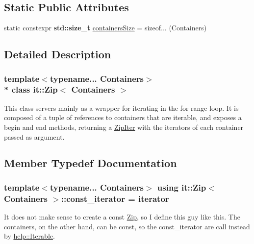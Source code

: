 \subsection*{Static Public Attributes}
\begin{DoxyCompactItemize}
\item 
static constexpr {\bf std\+::size\+\_\+t} \hyperlink{classit_1_1Zip_acab4facb889a92e7f2d2c3c4b1f7d2ab}{containers\+Size} = sizeof... (Containers)
\end{DoxyCompactItemize}


\subsection{Detailed Description}
\subsubsection*{template$<$typename... Containers$>$\\*
class it\+::\+Zip$<$ Containers $>$}

This class servers mainly as a wrapper for iterating in the for range loop. It is composed of a tuple of references to containers that are iterable, and exposes a \textquotesingle{}begin\textquotesingle{} and \textquotesingle{}end\textquotesingle{} methods, returning a \textquotesingle{}\hyperlink{classit_1_1ZipIter}{Zip\+Iter}\textquotesingle{} with the iterators of each container passed as argument. 

\subsection{Member Typedef Documentation}
\subsubsection[{\texorpdfstring{const\+\_\+iterator}{const_iterator}}]{\setlength{\rightskip}{0pt plus 5cm}template$<$typename... Containers$>$ using {\bf it\+::\+Zip}$<$ Containers $>$\+::{\bf const\+\_\+iterator} =  {\bf iterator}}\hypertarget{classit_1_1Zip_ac9c7dacbb33c23f586cb8886fdd58275}{}\label{classit_1_1Zip_ac9c7dacbb33c23f586cb8886fdd58275}
It does not make sense to create a const \hyperlink{classit_1_1Zip}{Zip}, so I define this guy like this. The containers, on the other hand, can be const, so the const\+\_\+iterator are call instead by \textquotesingle{}\hyperlink{structit_1_1help_1_1Iterable}{help\+::\+Iterable}\textquotesingle{}. 
